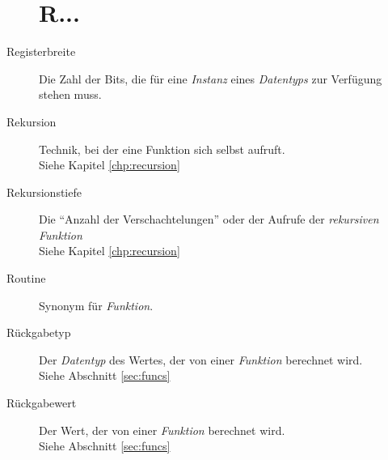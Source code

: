 \begin{appendices}
\begin{description}
\section*{R...}
\item[Registerbreite] Die Zahl der Bits, die für eine \emph{Instanz} eines \emph{Datentyps} zur
	Verfügung stehen muss.
\item[Rekursion] Technik, bei der eine Funktion sich selbst aufruft.\\
	Siehe Kapitel \ref{chp:recursion}
\item[Rekursionstiefe] Die \enquote{Anzahl der Verschachtelungen} oder der Aufrufe der \emph{rekursiven}
	\emph{Funktion}\\
	Siehe Kapitel \ref{chp:recursion}
\item[Routine] Synonym für \emph{Funktion}.
\item[Rückgabetyp] Der \emph{Datentyp} des Wertes, der von einer \emph{Funktion} berechnet wird.\\
	Siehe Abschnitt \ref{sec:funcs}
\item[Rückgabewert] Der Wert, der von einer \emph{Funktion} berechnet wird.\\
	Siehe Abschnitt \ref{sec:funcs}


\end{description}
\end{appendices}
